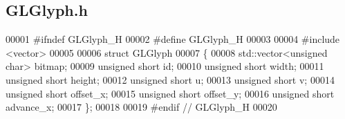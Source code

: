 \subsection{G\+L\+Glyph.\+h}
\label{GLGlyph_8h_source}

\begin{DoxyCode}
00001 \textcolor{preprocessor}{#ifndef GLGlyph\_H}
00002 \textcolor{preprocessor}{#define GLGlyph\_H}
00003 
00004 \textcolor{preprocessor}{#include <vector>}
00005 
00006 \textcolor{keyword}{struct }GLGlyph
00007 \{
00008     std::vector<unsigned char> bitmap;
00009     \textcolor{keywordtype}{unsigned} \textcolor{keywordtype}{short} id;
00010     \textcolor{keywordtype}{unsigned} \textcolor{keywordtype}{short} width;
00011     \textcolor{keywordtype}{unsigned} \textcolor{keywordtype}{short} height;
00012     \textcolor{keywordtype}{unsigned} \textcolor{keywordtype}{short} u;
00013     \textcolor{keywordtype}{unsigned} \textcolor{keywordtype}{short} v;
00014     \textcolor{keywordtype}{unsigned} \textcolor{keywordtype}{short} offset_x;
00015     \textcolor{keywordtype}{unsigned} \textcolor{keywordtype}{short} offset_y;
00016     \textcolor{keywordtype}{unsigned} \textcolor{keywordtype}{short} advance_x;
00017 \};
00018 
00019 \textcolor{preprocessor}{#endif // GLGlyph\_H}
00020 
\end{DoxyCode}
